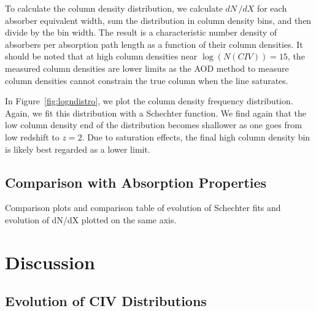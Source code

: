 \documentclass[linenumbers,twocolumn]{aastex61}
\begin{document}
To calculate the column density distribution, we calculate $dN\,/dX$ for each absorber equivalent width, sum the distribution in column density bins, and then divide by the bin width. The result is a characteristic number density of {\CIV} absorbers per absorption path length as a function of their column densities. It should be noted that at high column densities near $\log (N(CIV)) = 15$, the measured column densities are lower limits as the AOD method to measure column densities cannot constrain the true column when the line saturates.

In Figure~\ref{fig:logndistro}, we plot the column density frequency distribution. Again, we fit this distribution with a Schechter function. We find again that the low column density end of the distribution becomes shallower as one goes from low redshift to $z = 2$. Due to saturation effects, the final high column density bin is likely best regarded as a lower limit.

\begin{figure*}[bth]
\caption{The column density distribution of ${\CIV}$ absorbers, defined as the comoving line density in each column density bin divided by the bin width. We fit this distribution with a Schechter function.}
\label{fig:logndistrodndz}
\end{figure*}

\begin{figure*}[bth]
\caption{The column density distribution of {\CIV} absorbers, defined as the comoving line density in each column density bin divided by the bin width. We fit this distribution with a Schechter function.}
\label{fig:logndistro}
\end{figure*}

\subsection{Comparison with {\MgII} Absorption Properties}

Comparison plots and comparison table of evolution of Schechter fits and evolution of dN/dX plotted on the same axis.


\section{Discussion}
\label{sec:discussion}

\subsection{Evolution of CIV Distributions}
\end{document}
